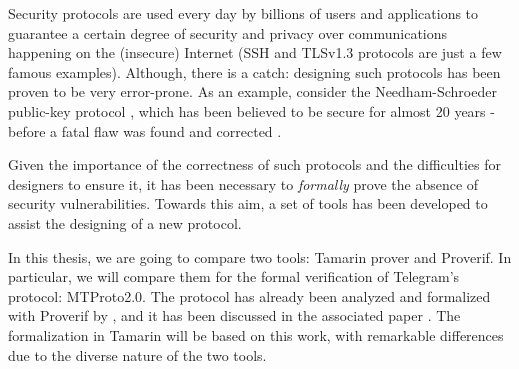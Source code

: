 \label{section:introduction}

Security protocols are used every day by billions of users and applications to guarantee a certain degree of security and privacy over communications happening on the (insecure) Internet (SSH \cite{rfc4251} and TLSv1.3 \cite{TLSv1.3_specs} protocols are just a few famous examples). Although, there is a catch: designing such protocols has been proven to be very error-prone. As an example, consider the Needham-Schroeder public-key protocol \cite{NSPK}, which has been believed to be secure for almost 20 years - before a fatal flaw was found and corrected \cite{NSPK_LoweGavin}.

Given the importance of the correctness of such protocols and the difficulties for designers to ensure it, it has been necessary to \textit{formally} prove the absence of security vulnerabilities. Towards this aim, a set of tools has been developed to assist the designing of a new protocol.

In this thesis, we are going to compare two tools: Tamarin prover and Proverif. In particular, we will compare them for the formal verification of Telegram's protocol: MTProto2.0. The protocol has already been analyzed and formalized with Proverif by \MMNV{} \cite{MTProto2-Proverif-impl}, and it has been discussed in the associated paper \cite{MTProto2-Proverif}. The formalization in Tamarin will be based on this work, with remarkable differences due to the diverse nature of the two tools.
